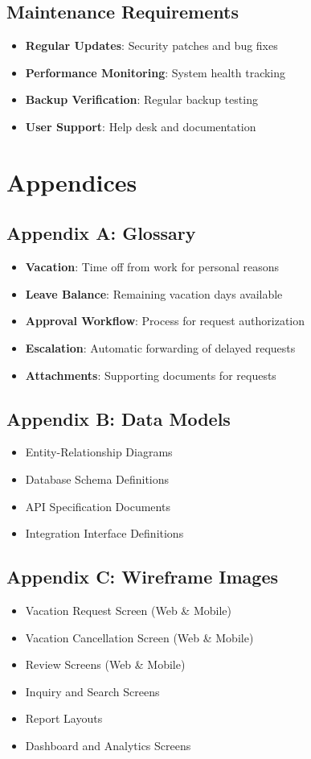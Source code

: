\documentclass[12pt,a4paper]{article}
\begin{document}
\subsection{Maintenance Requirements}
\begin{itemize}
    \item \textbf{Regular Updates}: Security patches and bug fixes
    \item \textbf{Performance Monitoring}: System health tracking
    \item \textbf{Backup Verification}: Regular backup testing
    \item \textbf{User Support}: Help desk and documentation
\end{itemize}

\section{Appendices}

\subsection{Appendix A: Glossary}
\begin{itemize}
    \item \textbf{Vacation}: Time off from work for personal reasons
    \item \textbf{Leave Balance}: Remaining vacation days available
    \item \textbf{Approval Workflow}: Process for request authorization
    \item \textbf{Escalation}: Automatic forwarding of delayed requests
    \item \textbf{Attachments}: Supporting documents for requests
\end{itemize}

\subsection{Appendix B: Data Models}
\begin{itemize}
    \item Entity-Relationship Diagrams
    \item Database Schema Definitions
    \item API Specification Documents
    \item Integration Interface Definitions
\end{itemize}

\subsection{Appendix C: Wireframe Images}
\begin{itemize}
    \item Vacation Request Screen (Web \& Mobile)
    \item Vacation Cancellation Screen (Web \& Mobile)
    \item Review Screens (Web \& Mobile)
    \item Inquiry and Search Screens
    \item Report Layouts
    \item Dashboard and Analytics Screens
\end{itemize}
\end{document}

